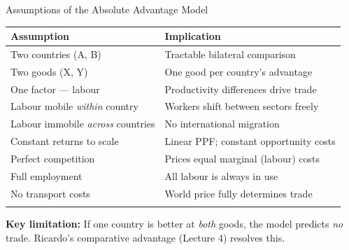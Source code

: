 \documentclass[
  ignorenonframetext,
  aspectratio=169,
]{beamer}
\makeatletter
\let\quarto@originallabel\label
\DeclareRobustCommand*{\label}[1]{\quarto@originallabel{#1}}
\makeatother
\begin{document}
\begin{frame}{Assumptions of the Absolute Advantage Model}
\label{assumptions-of-the-absolute-advantage-model}
\begin{longtable}[]{@{}
  >{\raggedright\arraybackslash}p{}
  >{\raggedright\arraybackslash}p{}@{}}
\toprule\noalign{}
\begin{minipage}[b]{\linewidth}\raggedright
Assumption
\end{minipage} & \begin{minipage}[b]{\linewidth}\raggedright
Implication
\end{minipage} \\
\midrule\noalign{}
\endhead
Two countries (A, B) & Tractable bilateral comparison \\
Two goods (X, Y) & One good per country's advantage \\
One factor --- labour & Productivity differences drive trade \\
Labour mobile \emph{within} country & Workers shift between sectors
freely \\
Labour immobile \emph{across} countries & No international migration \\
Constant returns to scale & Linear PPF; constant opportunity costs \\
Perfect competition & Prices equal marginal (labour) costs \\
Full employment & All labour is always in use \\
No transport costs & World price fully determines trade \\
\bottomrule\noalign{}
\end{longtable}

\textbf{Key limitation:} If one country is better at \emph{both} goods,
the model predicts \emph{no} trade. Ricardo's comparative advantage
(Lecture 4) resolves this.
\end{frame}
\end{document}
